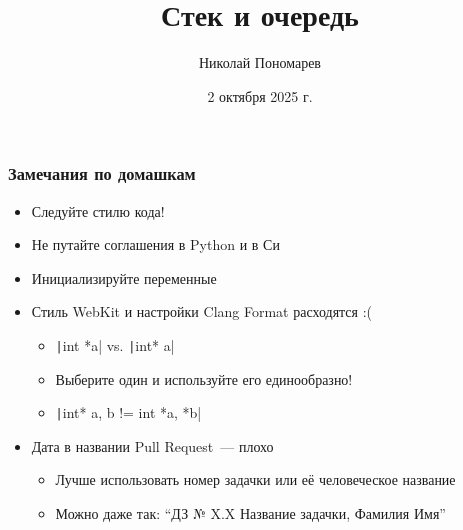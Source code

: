 \documentclass[aspectratio=169]{beamer}
\title{Стек и очередь}
\author{Николай Пономарев}
\date{2 октября 2025 г.}
\begin{document}
\begin{frame}
    \titlepage
\end{frame}

\begin{frame}[fragile]
    \frametitle{Замечания по домашкам}

    \begin{itemize}
        \item Следуйте стилю кода!
        \item Не путайте соглашения в Python и в Си
        \item Инициализируйте переменные
        \item Стиль WebKit и настройки Clang Format расходятся :(
              \begin{itemize}
                  \item \texttt|int *a| vs. \texttt|int* a|
                  \item Выберите один и используйте его единообразно!
                  \item \texttt|int* a, b != int *a, *b|
              \end{itemize}
        \item Дата в названии Pull Request~--- плохо
              \begin{itemize}
                  \item Лучше использовать номер задачки или её человеческое название
                  \item Можно даже так: \enquote{ДЗ № X.X Название задачки, Фамилия Имя}
              \end{itemize}
    \end{itemize}

\end{frame}
\end{document}
